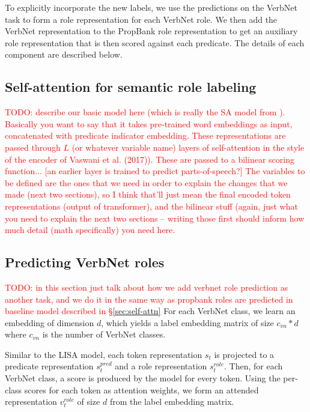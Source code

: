 \documentclass[11pt,a4paper]{article}
\newcommand{\emmatodo}[1]{\textcolor{red}{TODO: #1}}
\begin{document}
To explicitly incorporate the new labels, we use the predictions on the VerbNet task to form a role representation for each VerbNet role. We then add the VerbNet representation to the PropBank role representation to get an auxiliary role representation that is then scored against each predicate. The details of each component are described below.

\subsection{Self-attention for semantic role labeling \label{sec:self-attn}}

\emmatodo{describe our basic model here (which is really the SA model from \citep{strubell2018linguistically}). Basically you want to say that it takes pre-trained word embeddings as input, concatenated with predicate indicator embedding. These representations are passed through $L$ (or whatever variable name) layers of self-attention in the style of the encoder of Vaswani et al. (2017)). These are passed to a bilinear scoring function... [an earlier layer is trained to predict parts-of-speech?] The variables to be defined are the ones that we need in order to explain the changes that we made (next two sections), so I think that'll just mean the final encoded token representations (output of transformer), and the bilinear stuff (again, just what you need to explain the next two sections -- writing those first should inform how much detail (math specifically) you need here. }

\subsection{Predicting VerbNet roles}
\emmatodo{in this section just talk about how we add verbnet role prediction as another task, and we do it in the same way as propbank roles are predicted in baseline model described in \S\ref{sec:self-attn}}
For each VerbNet class, we learn an embedding of dimension $d$, which yields a label embedding matrix of size $c_{vn} * d$ where $c_{vn}$ is the number of VerbNet classes. 

Similar to the LISA model, each token representation $s_t$ is projected to a predicate representation $s_t^{pred}$ and a role representation $s_t^{role}$. Then, for each VerbNet class, a score is produced by the model for every token. Using the per-class scores for each token as attention weights, we form an attended representation $v_t^{role}$ of size $d$ from the label embedding matrix.
\end{document}
